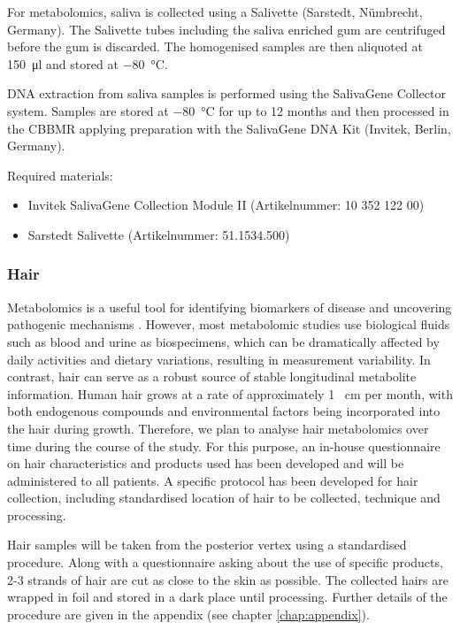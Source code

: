 For metabolomics, saliva is collected using a Salivette\regd{} (Sarstedt, Nümbrecht, Germany). The Salivette tubes including the saliva enriched gum are centrifuged before the gum is discarded.  The homogenised samples are then aliquoted at \SI[round-precision = 0, round-mode = places]{150}{\micro\litre} and stored at \SI[round-precision = 0, round-mode = places]{-80}{\degreeCelsius}.

DNA extraction from saliva samples is performed using the SalivaGene Collector system. Samples are stored at \SI[round-precision = 0, round-mode = places]{-80}{\degreeCelsius} for up to \num[round-precision = 0, round-mode = places]{12} months and then processed in the \ac{CBBMR} applying preparation with the SalivaGene DNA Kit (Invitek, Berlin, Germany).

\noindent Required materials:
\begin{itemize}
\item Invitek SalivaGene Collection Module II (Artikelnummer: 10 352 122 00)
\item Sarstedt Salivette (Artikelnummer: 51.1534.500)
\end{itemize}

\subsubsection{Hair}
\label{biosamples:hair}
Metabolomics is a useful tool for identifying biomarkers of disease and uncovering pathogenic mechanisms \cite{Chen2021}. However, most metabolomic studies use biological fluids such as blood and urine as biospecimens, which can be dramatically affected by daily activities and dietary variations, resulting in measurement variability. In contrast, hair can serve as a robust source of stable longitudinal metabolite information. Human hair grows at a rate of approximately \num{1} \SI{}{\centi\metre} per month, with both endogenous compounds and environmental factors being incorporated into the hair during growth. Therefore, we plan to analyse hair metabolomics over time during the course of the study. For this purpose, an in-house questionnaire on hair characteristics and products used has been developed and will be administered to all patients. A specific protocol has been developed for hair collection, including standardised location of hair to be collected, technique and processing. 

Hair samples will be taken from the posterior vertex using a standardised procedure. Along with a questionnaire asking about the use of specific products, 2-3 strands of hair are cut as close to the skin as possible. The collected hairs are wrapped in foil and stored in a dark place until processing. Further details of the procedure are given in the appendix (see chapter \ref{chap:appendix}).


